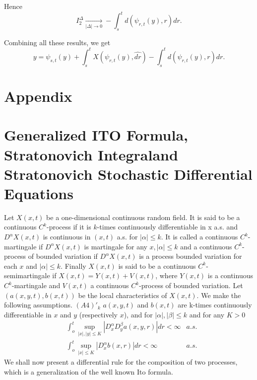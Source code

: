 Hence
$$
I_2^{\Delta} \xrightarrow[|\Delta| \rightarrow 0]{} - \int_s^t
d(\psi_{r, t} (y), r) dr. 
$$

Combining all these results, we get
$$
y = \psi_{s,t}(y)+ \int_s^t X(\psi_{r,t}(y), \hat{dr} ) - \int_s^t 
d(\psi_{r, t}(y), r)dr. 
$$




\section{Appendix}\label{chap2:app2.7}%

\section*{Generalized ITO Formula, Stratonovich Integral\hfil\break and
  Stratonovich Stochastic Differential Equations}

Let $X(x, t)$ be a one-dimensional continuous random field. It is said
to be a continuous $C^k$-process if it is $k$-times continuously
differentiable in x a.s. and $D^{\alpha} X (x,t)$ is continuous in $(x,
t) $ a.s. for 
$|\alpha| \le k$. It is called a continuous $C^k$-martingale if
$D^{\alpha}X(x, t)$  is martingale for any $x, |\alpha|\le k$ and a
continuous $C^k$-process of bounded variation if  $D^{\alpha}X(x, t)$
is a process bounded variation for each $x$ and $|\alpha| \le
k$. Finally $X(x, t)$ is said to be a continuous $C^k$-semimartingale
if $X(x, t) = Y(x, t) + V(x, t)$, where $Y(x, t)$ is a continuous
$C^k$-martingale and $V(x,t)$ a continuous $C^k$-process of bounded
variation. Let $(a(x, y, t), b (x, t))$ be the local characteristics
of $X(x, t)$. We make the following assumptions. $(A4)'_k$ $a(x, y, t)$
and $b(x, t)$ are k-times continuously differentiable in $x$ and 
$y$\pageoriginale
(respectively $x$), and for $|\alpha|, |\beta| \le k$ and for any $K >
0$ 
\begin{align*}
  & \int_o^t  \sup_{|x|, |y| \le K} |D^{\alpha}_x D^{\beta}_y a(x, y,
  r)| dr < \infty & a.s.\\ 
  &  \int_o^t  \sup_{|x| \le K} |D^{\alpha}_x b(x, r)| dr < \infty & a.s.
\end{align*}
We shall now present a differential rule for the composition of two
processes, which is a generalization of the well known Ito formula. 

